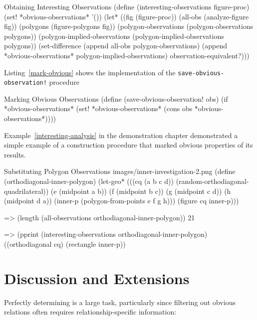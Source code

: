 \newpage

\begin{code-listing}
[label=interesting-obs-impl]
{Obtaining Interesting Observations}
(define (interesting-observations figure-proc)
  (set! *obvious-observations* '())
  (let* ((fig (figure-proc))
         (all-obs (analyze-figure fig))
         (polygons (figure-polygons fig))
         (polygon-observations (polygon-observations polygons))
         (polygon-implied-observations
           (polygon-implied-observations polygons))
    (set-difference (append all-obs polygon-observations)
                    (append *obvious-observations* polygon-implied-observations)
                    observation-equivalent?)))
\end{code-listing}

Listing~\ref{mark-obvious} shows the implementation of the
\texttt{save-obvious-observation!} procedure

\begin{code-listing}
[label=mark-obvious]
{Marking Obvious Observations}
(define (save-obvious-observation! obs)
  (if *obvious-observations*
      (set! *obvious-observations*
            (cons obs *obvious-observations*))))
\end{code-listing}

Example~\ref{interesting-analysis} in the demonstration chapter
demonstrated a simple example of a construction procedure that marked
obvious properties of its results.

\begin{img-example}
[label=ortho-interesting]
{Substituting Polygon Observations}
{images/inner-investigation-2.png}
(define (orthodiagonal-inner-polygon)
  (let-geo*
      (((cq (a b c d)) (random-orthodiagonal-quadrilateral))
       (e (midpoint a b))
       (f (midpoint b c))
       (g (midpoint c d))
       (h (midpoint d a))
       (inner-p (polygon-from-points e f g h)))
    (figure cq inner-p)))

=> (length (all-observations orthodiagonal-inner-polygon))
21

=> (pprint (interesting-observations orthodiagonal-inner-polygon)
((orthodiagonal cq) (rectangle inner-p))
\end{img-example}

\section{Discussion and Extensions}

Perfectly determining is a large task, particularly since filtering
out obvious relations often requires relationship-specific information:

